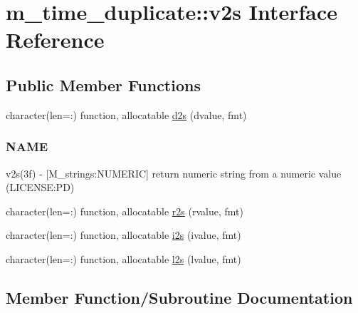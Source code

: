 \hypertarget{interfacem__time__duplicate_1_1v2s}{}\section{m\+\_\+time\+\_\+duplicate\+:\+:v2s Interface Reference}
\label{interfacem__time__duplicate_1_1v2s}
\subsection*{Public Member Functions}
\begin{DoxyCompactItemize}
\item 
character(len=\+:) function, allocatable \mbox{\hyperlink{interfacem__time__duplicate_1_1v2s_a553980ae13272c0ec94f3809ce0c38f2}{d2s}} (dvalue, fmt)
\begin{DoxyCompactList}\small\item\em \subsubsection*{N\+A\+ME}

v2s(3f) -\/ \mbox{[}M\+\_\+strings\+:N\+U\+M\+E\+R\+IC\mbox{]} return numeric string from a numeric value (L\+I\+C\+E\+N\+SE\+:PD) \end{DoxyCompactList}\item 
character(len=\+:) function, allocatable \mbox{\hyperlink{interfacem__time__duplicate_1_1v2s_aef0eec8516ef796d42f060d25c7e9dc3}{r2s}} (rvalue, fmt)
\item 
character(len=\+:) function, allocatable \mbox{\hyperlink{interfacem__time__duplicate_1_1v2s_a753dd0a1757b4090937356a377849b13}{i2s}} (ivalue, fmt)
\item 
character(len=\+:) function, allocatable \mbox{\hyperlink{interfacem__time__duplicate_1_1v2s_ae0e736d40ed72468d824df5b0b70ea66}{l2s}} (lvalue, fmt)
\end{DoxyCompactItemize}


\subsection{Member Function/\+Subroutine Documentation}
\mbox{\label{interfacem__time__duplicate_1_1v2s_a553980ae13272c0ec94f3809ce0c38f2}} 

